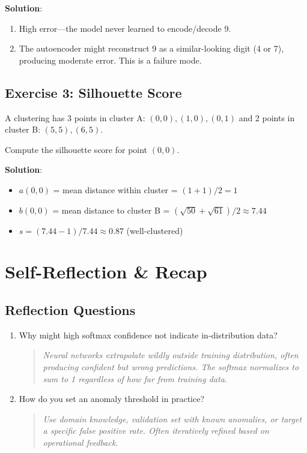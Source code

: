 \textbf{Solution}:
\begin{enumerate}
    \item High error---the model never learned to encode/decode 9.
    \item The autoencoder might reconstruct 9 as a similar-looking digit (4 or 7), producing moderate error. This is a failure mode.
\end{enumerate}

\subsection{Exercise 3: Silhouette Score}

A clustering has 3 points in cluster A: $(0,0), (1,0), (0,1)$ and 2 points in cluster B: $(5,5), (6,5)$.

Compute the silhouette score for point $(0,0)$.

\textbf{Solution}:
\begin{itemize}
    \item $a(0,0)$ = mean distance within cluster = $(1 + 1)/2 = 1$
    \item $b(0,0)$ = mean distance to cluster B = $(\sqrt{50} + \sqrt{61})/2 \approx 7.44$
    \item $s = (7.44 - 1) / 7.44 \approx 0.87$ (well-clustered)
\end{itemize}


\section{Self-Reflection \& Recap}

\subsection{Reflection Questions}
\begin{enumerate}
    \item Why might high softmax confidence not indicate in-distribution data?
    \begin{quote}
        \textit{Neural networks extrapolate wildly outside training distribution, often producing confident but wrong predictions. The softmax normalizes to sum to 1 regardless of how far from training data.}
    \end{quote}

    \item How do you set an anomaly threshold in practice?
    \begin{quote}
        \textit{Use domain knowledge, validation set with known anomalies, or target a specific false positive rate. Often iteratively refined based on operational feedback.}
    \end{quote}
\end{enumerate}

